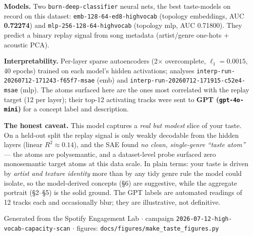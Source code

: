 \documentclass[11pt]{article}
\begin{document}
\textbf{Models.} Two \texttt{burn-deep-classifier} neural nets, the best
taste-models on record on this dataset:
\texttt{emb-128-64-ed8-highvocab} (topology embeddings, AUC \textbf{0.72274}) and
\texttt{mlp-256-128-64-highvocab} (topology mlp, AUC 0.71800). They predict a
binary replay signal from song metadata (artist/genre one-hots $+$ acoustic PCA).

\textbf{Interpretability.} Per-layer sparse autoencoders (2$\times$ overcomplete,
$\ell_1=0.0015$, 40 epochs) trained on each model's hidden activations; analyses
\texttt{interp-run-20260712-171243-f65f7-msae} (emb) and
\texttt{interp-run-20260712-171915-c52e4-msae} (mlp). The atoms surfaced here are
the ones most correlated with the replay target (12 per layer); their top-12
activating tracks were sent to \textbf{GPT (\texttt{gpt-4o-mini})} for a concept
label and description.

\textbf{The honest caveat.} This model captures a \emph{real but modest} slice of
your taste. On a held-out split the replay signal is only weakly decodable from
the hidden layers (linear $R^2 \approx 0.14$), and the SAE found \emph{no clean,
single-genre ``taste atom''} --- the atoms are polysemantic, and a dataset-level
probe surfaced zero monosemantic target atoms at this data scale. In plain terms:
your taste is driven by \emph{artist and texture identity} more than by any tidy
genre rule the model could isolate, so the model-derived concepts (\S6) are
suggestive, while the aggregate portrait (\S2--\S5) is the solid ground. The
GPT labels are automated readings of 12 tracks each and occasionally blur; they
are illustrative, not definitive.

\vfill
\begin{center}\small
Generated from the Spotify Engagement Lab
$\cdot$ campaign \texttt{2026-07-12-high-vocab-capacity-scan}
$\cdot$ figures: \texttt{docs/figures/make\_taste\_figures.py}
\end{center}
\end{document}
